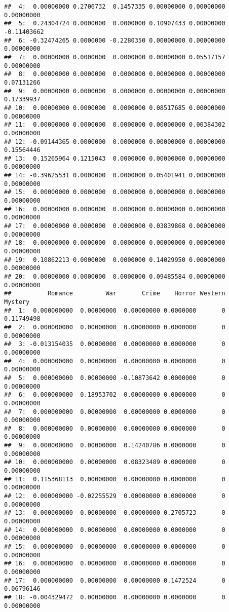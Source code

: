 \documentclass[
]{article}
\begin{document}
\begin{verbatim}
##  4:  0.00000000 0.2706732  0.1457335 0.00000000 0.00000000  0.00000000
##  5:  0.24304724 0.0000000  0.0000000 0.10907433 0.00000000 -0.11403662
##  6: -0.32474265 0.0000000 -0.2280350 0.00000000 0.00000000  0.00000000
##  7:  0.00000000 0.0000000  0.0000000 0.00000000 0.05517157  0.00000000
##  8:  0.00000000 0.0000000  0.0000000 0.00000000 0.00000000  0.07131266
##  9:  0.00000000 0.0000000  0.0000000 0.00000000 0.00000000  0.17339937
## 10:  0.00000000 0.0000000  0.0000000 0.08517685 0.00000000  0.00000000
## 11:  0.00000000 0.0000000  0.0000000 0.00000000 0.00384302  0.00000000
## 12: -0.09144365 0.0000000  0.0000000 0.00000000 0.00000000  0.15564446
## 13:  0.15265964 0.1215043  0.0000000 0.00000000 0.00000000  0.00000000
## 14: -0.39625531 0.0000000  0.0000000 0.05401941 0.00000000  0.00000000
## 15:  0.00000000 0.0000000  0.0000000 0.00000000 0.00000000  0.00000000
## 16:  0.00000000 0.0000000  0.0000000 0.00000000 0.00000000  0.00000000
## 17:  0.00000000 0.0000000  0.0000000 0.03839868 0.00000000  0.00000000
## 18:  0.00000000 0.0000000  0.0000000 0.00000000 0.00000000  0.00000000
## 19:  0.10862213 0.0000000  0.0000000 0.14029950 0.00000000  0.00000000
## 20:  0.00000000 0.0000000  0.0000000 0.09485584 0.00000000  0.00000000
##          Romance         War       Crime    Horror Western    Mystery
##  1:  0.000000000  0.00000000  0.00000000 0.0000000       0 0.11749498
##  2:  0.000000000  0.00000000  0.00000000 0.0000000       0 0.00000000
##  3: -0.013154035  0.00000000  0.00000000 0.0000000       0 0.00000000
##  4:  0.000000000  0.00000000  0.00000000 0.0000000       0 0.00000000
##  5:  0.000000000  0.00000000 -0.10873642 0.0000000       0 0.00000000
##  6:  0.000000000  0.18953702  0.00000000 0.0000000       0 0.00000000
##  7:  0.000000000  0.00000000  0.00000000 0.0000000       0 0.00000000
##  8:  0.000000000  0.00000000  0.00000000 0.0000000       0 0.00000000
##  9:  0.000000000  0.00000000  0.14240786 0.0000000       0 0.00000000
## 10:  0.000000000  0.00000000  0.08323489 0.0000000       0 0.00000000
## 11:  0.115368113  0.00000000  0.00000000 0.0000000       0 0.00000000
## 12:  0.000000000 -0.02255529  0.00000000 0.0000000       0 0.00000000
## 13:  0.000000000  0.00000000  0.00000000 0.2705723       0 0.00000000
## 14:  0.000000000  0.00000000  0.00000000 0.0000000       0 0.00000000
## 15:  0.000000000  0.00000000  0.00000000 0.0000000       0 0.00000000
## 16:  0.000000000  0.00000000  0.00000000 0.0000000       0 0.00000000
## 17:  0.000000000  0.00000000  0.00000000 0.1472524       0 0.06796146
## 18: -0.004329472  0.00000000  0.00000000 0.0000000       0 0.00000000

\end{verbatim}
\end{document}
